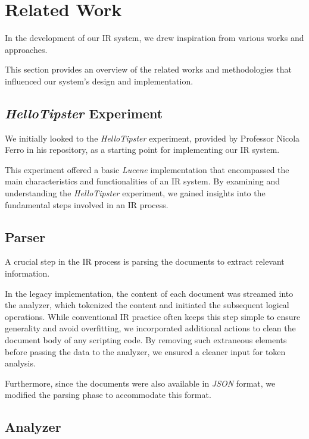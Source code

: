\section{Related Work}
\label{sec:related}

In the development of our \ac{IR} system, we drew inspiration from various works and approaches. 

This section provides an overview of the related works and methodologies that influenced our system's design and implementation.

\subsection{\textit{HelloTipster} Experiment}

We initially looked to the \textit{HelloTipster} \cite{hello-tipster} experiment, provided by Professor Nicola Ferro in his repository, as a starting point for implementing our \ac{IR} system. 

This experiment offered a basic \textit{Lucene} \cite{lucene} implementation that encompassed the main characteristics and functionalities of an \ac{IR} system. By examining and understanding the \textit{HelloTipster} experiment, we gained insights into the fundamental steps involved in an \ac{IR} process.

\subsection{Parser}

A crucial step in the \ac{IR} process is parsing the documents to extract relevant information. 

In the legacy implementation, the content of each document was streamed into the analyzer, which tokenized the content and initiated the subsequent logical operations. While conventional \ac{IR} practice often keeps this step simple to ensure generality and avoid overfitting, we incorporated additional actions to clean the document body of any scripting code. By removing such extraneous elements before passing the data to the analyzer, we ensured a cleaner input for token analysis. 

Furthermore, since the documents were also available in \textit{JSON} format, we modified the parsing phase to accommodate this format.

\subsection{Analyzer}

